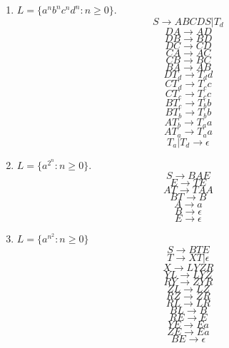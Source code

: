 \documentclass[paper=a4, fontsize=11pt]{scrartcl} %
\begin{document}
\begin{enumerate}
\item $L = \{a^{n}b^{n}c^{n}d^{n} : n\geq 0\}$.
  $$S \rightarrow ABCDS | T_d$$
  $$DA \rightarrow AD$$
  $$DB \rightarrow BD$$
  $$DC \rightarrow CD$$
  $$CA \rightarrow AC$$
  $$CB \rightarrow BC$$
  $$BA \rightarrow AB$$
  $$DT_d \rightarrow T_dd$$
  $$CT_d \rightarrow T_cc$$
  $$CT_c \rightarrow T_cc$$
  $$BT_c \rightarrow T_bb$$
  $$BT_b \rightarrow T_bb$$
  $$AT_b \rightarrow T_aa$$
  $$AT_a \rightarrow T_aa$$
  $$T_a | T_d \rightarrow \epsilon$$

\item $L = \{a^{2^{n}} : n\geq 0\}$.
  $$S \rightarrow BAE$$
  $$E \rightarrow TE$$
  $$AT \rightarrow TAA$$
  $$BT \rightarrow B$$
  $$A \rightarrow a$$
  $$B \rightarrow \epsilon$$
  $$E \rightarrow \epsilon$$

\item $L = \{a^{n^{2}} : n\geq 0\}$
  $$S \rightarrow BTE$$
  $$T \rightarrow XT | \epsilon$$
  $$X \rightarrow LYZR$$
  $$YL \rightarrow LYZ$$
  $$RY \rightarrow ZYR$$
  $$ZL \rightarrow LZ$$
  $$RZ \rightarrow ZR$$
  $$RL \rightarrow LR$$
  $$BL \rightarrow B$$
  $$RE \rightarrow E$$
  $$YE \rightarrow Ea$$
  $$ZE \rightarrow Ea$$
  $$BE \rightarrow \epsilon$$

\end{enumerate}


\pagebreak
\end{document}
